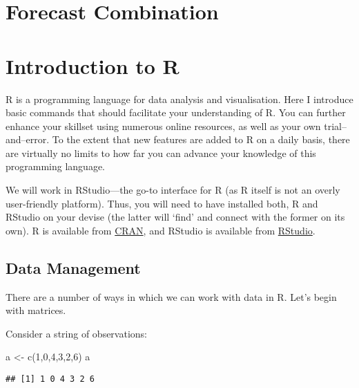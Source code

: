 \documentclass[
  oneside]{book}
\newenvironment{Shaded}{\begin{snugshade}}{\end{snugshade}}
\newcommand{\DecValTok}[1]{\textcolor[rgb]{0.00,0.00,0.81}{#1}}
\newcommand{\FunctionTok}[1]{\textcolor[rgb]{0.00,0.00,0.00}{#1}}
\newcommand{\NormalTok}[1]{#1}
\newcommand{\OtherTok}[1]{\textcolor[rgb]{0.56,0.35,0.01}{#1}}
\begin{document}
\hypertarget{forecast-combination}{%
\chapter{Forecast Combination}\label{forecast-combination}}

\hypertarget{introduction-to-r}{%
\chapter*{Introduction to R}\label{introduction-to-r}}

R is a programming language for data analysis and visualisation. Here I introduce basic commands that should facilitate your understanding of R. You can further enhance your skillset using numerous online resources, as well as your own trial--and--error. To the extent that new features are added to R on a daily basis, there are virtually no limits to how far you can advance your knowledge of this programming language.

We will work in RStudio---the go-to interface for R (as R itself is not an overly user-friendly platform). Thus, you will need to have installed both, R and RStudio on your devise (the latter will `find' and connect with the former on its own). R is available from \href{https://cran.r-project.org/}{CRAN}, and RStudio is available from \href{https://www.rstudio.com/}{RStudio}.

\hypertarget{data-management}{%
\section*{Data Management}\label{data-management}}

There are a number of ways in which we can work with data in R. Let's begin with matrices.

Consider a string of observations:

\begin{Shaded}
\begin{Highlighting}[]
\NormalTok{a }\OtherTok{\textless{}{-}} \FunctionTok{c}\NormalTok{(}\DecValTok{1}\NormalTok{,}\DecValTok{0}\NormalTok{,}\DecValTok{4}\NormalTok{,}\DecValTok{3}\NormalTok{,}\DecValTok{2}\NormalTok{,}\DecValTok{6}\NormalTok{)}
\NormalTok{a}
\end{Highlighting}
\end{Shaded}

\begin{verbatim}
## [1] 1 0 4 3 2 6
\end{verbatim}
\end{document}
